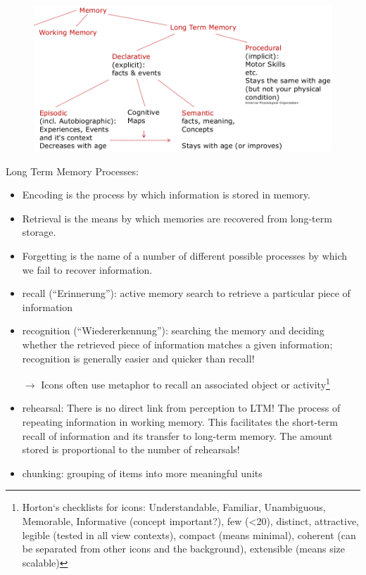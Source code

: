 \begin{figure}[h!]
	\centering
	\includegraphics[width=.5\textwidth]{img/ch03_mem.png}
	\caption{}
	\label{Memory Model}
\end{figure} 
Long Term Memory Processes:
\begin{itemize}
\item Encoding is the process by which information is stored in memory.
\item Retrieval is the means by which memories are recovered from long-term storage.
\item Forgetting is the name of a number of different possible processes by which we fail to recover information.
\item recall (``Erinnerung''): active memory search to retrieve a particular piece of information
\item recognition (``Wiedererkennung''): searching the memory and deciding whether the retrieved piece of information matches a given information; recognition is generally easier and quicker than recall!
\item[$\rightarrow$] Icons often use metaphor to recall an associated object or activity\footnote{Horton‘s checklists for icons: Understandable, Familiar, Unambiguous, Memorable, Informative (concept important?), few (<20), distinct, attractive, legible (tested in all view contexts), compact (means minimal), coherent (can be separated from other icons and the background), extensible (means size scalable)}
\item rehearsal: There is no direct link from perception to LTM! The process of repeating information in working memory. This facilitates the short-term recall of information and its transfer to long-term memory. The amount stored is proportional to the number of rehearsals!
\item chunking: grouping of items into more meaningful units
\end{itemize}

